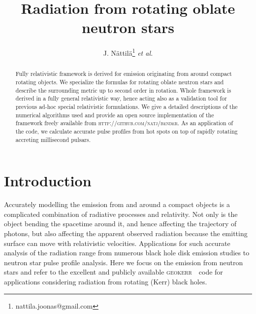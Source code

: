 \documentclass[iop, usenatbib]{emulateapj}
\begin{document}
\title{Radiation from rotating oblate neutron stars}

\author{J. N\"attil\"a\thanks{nattila.joonas@gmail.com} \textit{et al.} }

\affil{}


\begin{abstract}
Fully relativistic framework is derived for emission originating from around compact rotating objects.
We specialize the formulas for rotating oblate neutron stars and describe the surrounding metric up to second order in rotation.
Whole framework is derived in a fully general relativistic way, hence acting also as a validation tool for previous ad-hoc special relativistic formulations.
We give a detailed descriptions of the numerical algorithms used and provide an open source implementation of the framework freely available from \textsc{http://github.com/natj/bender}.
As an application of the code, we calculate accurate pulse profiles from hot spots on top of rapidly rotating accreting millisecond pulsars.
\end{abstract}

\section{Introduction}
Accurately modelling the emission from and around a compact objects is a complicated combination of radiative processes and relativity.
Not only is the object bending the spacetime around it, and hence affecting the trajectory of photons, but also affecting the apparent observed radiation because the emitting surface can move with relativistic velocities.
Applications for such accurate analysis of the radiation range from numerous black hole disk emission studies to neutron star pulse profile analysis.
Here we focus on the emission from neutron stars and refer to the excellent and publicly available \textsc{geokerr}~ code for applications considering radiation from rotating (Kerr) black holes.
\end{document}

